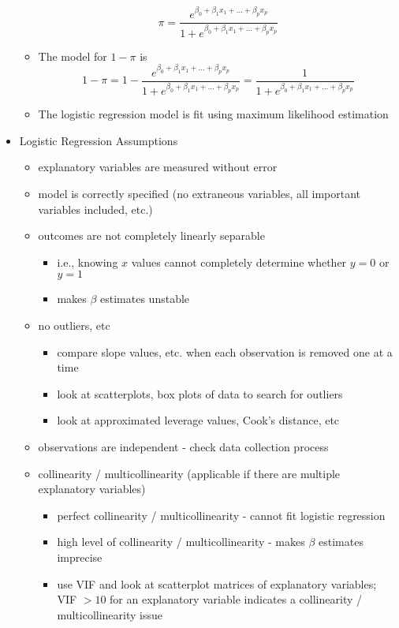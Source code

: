 \documentclass[12pt]{article}
\begin{document}
\begin{itemize}
\begin{itemize}
$$ \pi = \frac{e^{\beta_0 + \beta_1x_1 + \dots + \beta_px_p}}{1+e^{\beta_0 + \beta_1x_1 + \dots + \beta_px_p}} $$
\item The model for $1-\pi$ is $$ 1-\pi = 1 - \frac{e^{\beta_0 + \beta_1x_1 + \dots + \beta_px_p}}{1 + e^{\beta_0 + \beta_1x_1 + \dots + \beta_px_p}} = \frac{1}{1 + e^{\beta_0 + \beta_1x_1 + \dots + \beta_px_p}} $$ 
\item The logistic regression model is fit using maximum likelihood estimation \end{itemize} 
\item Logistic Regression Assumptions \begin{itemize} 
\item explanatory variables are measured without error 
\item model is correctly specified (no extraneous variables, all important variables included, etc.)
\item outcomes are not completely linearly separable \begin{itemize} 
\item i.e., knowing $x$ values cannot completely determine whether $y=0$ or $y=1$
\item makes $\beta$ estimates unstable \end{itemize} 
\item no outliers, etc \begin{itemize} 
\item compare slope values, etc. when each observation is removed one at a time 
\item look at scatterplots, box plots of data to search for outliers 
\item look at approximated leverage values, Cook's distance, etc \end{itemize} 
\item observations are independent - check data collection process 
\item collinearity / multicollinearity (applicable if there are multiple explanatory variables) \begin{itemize} 
\item perfect collinearity / multicollinearity - cannot fit logistic regression 
\item high level of collinearity / multicollinearity - makes $\beta$ estimates imprecise 
\item use VIF and look at scatterplot matrices of explanatory variables; VIF $> 10$ for an explanatory variable indicates a collinearity / multicollinearity issue \end{itemize} 

\end{itemize}
\end{itemize}
\end{document}
